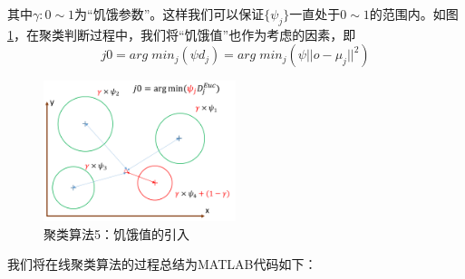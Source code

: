 其中$\gamma:0\sim1$为“饥饿参数”。这样我们可以保证$\{\psi_j\}$一直处于$0\sim 1$的范围内。如图\ref{fig:onlineclus5}，在聚类判断过程中，我们将“饥饿值”也作为考虑的因素，即
\begin{equation}
j0 = arg\;min_j (\psi d_j) = arg\;min_j (\psi ||o - \mu_j||^2 )
\end{equation}

\begin{figure}[htbp]
   \centering
   \includegraphics[width=0.5\textwidth]{OnlineClustering5.png} %
   \caption{聚类算法5：饥饿值的引入}
   \label{fig:onlineclus5}
\end{figure}

我们将在线聚类算法的过程总结为MATLAB代码如下：

